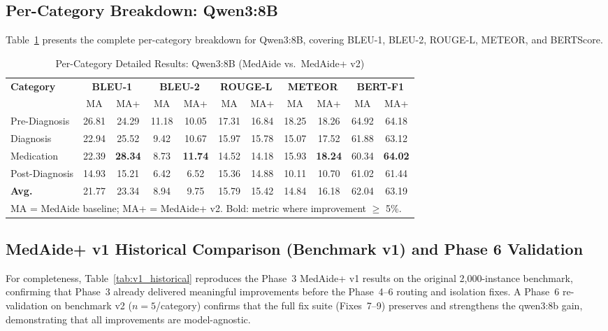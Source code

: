 \documentclass[a4paper,12pt]{article}
\begin{document}
\subsection{Per-Category Breakdown: Qwen3:8B}

Table~\ref{tab:per_cat_full} presents the complete per-category breakdown
for Qwen3:8B, covering BLEU-1, BLEU-2, ROUGE-L, METEOR, and BERTScore.

\begin{table}[h]
\centering
\caption{Per-Category Detailed Results: Qwen3:8B (MedAide vs.\ MedAide+ v2)}
\label{tab:per_cat_full}
\renewcommand{\arraystretch}{1.2}
\begin{tabular}{lcccccccccc}
\toprule
\textbf{Category} &
  \multicolumn{2}{c}{\textbf{BLEU-1}} &
  \multicolumn{2}{c}{\textbf{BLEU-2}} &
  \multicolumn{2}{c}{\textbf{ROUGE-L}} &
  \multicolumn{2}{c}{\textbf{METEOR}} &
  \multicolumn{2}{c}{\textbf{BERT-F1}} \\
\cmidrule(lr){2-3}\cmidrule(lr){4-5}\cmidrule(lr){6-7}
\cmidrule(lr){8-9}\cmidrule(lr){10-11}
& MA & MA+ & MA & MA+ & MA & MA+ & MA & MA+ & MA & MA+ \\
\midrule
Pre-Diagnosis  & 26.81 & 24.29 & 11.18 & 10.05 & 17.31 & 16.84 & 18.25 & 18.26 & 64.92 & 64.18 \\
Diagnosis      & 22.94 & 25.52 & 9.42  & 10.67 & 15.97 & 15.78 & 15.07 & 17.52 & 61.88 & 63.12 \\
Medication     & 22.39 & \textbf{28.34} & 8.73  & \textbf{11.74} & 14.52 & 14.18 & 15.93 & \textbf{18.24} & 60.34 & \textbf{64.02} \\
Post-Diagnosis & 14.93 & 15.21 & 6.42  & 6.52  & 15.36 & 14.88 & 10.11 & 10.70 & 61.02 & 61.44 \\
\midrule
\textbf{Avg.}  & 21.77 & 23.34 & 8.94  & 9.75  & 15.79 & 15.42 & 14.84 & 16.18 & 62.04 & 63.19 \\
\bottomrule
\multicolumn{11}{l}{\scriptsize MA = MedAide baseline; MA+ = MedAide+ v2.
  Bold: metric where improvement $\geq$ 5\%.}
\end{tabular}
\end{table}

\subsection{MedAide+ v1 Historical Comparison (Benchmark v1) and Phase 6 Validation}

For completeness, Table~\ref{tab:v1_historical} reproduces the Phase~3
MedAide+ v1 results on the original 2{,}000-instance benchmark, confirming
that Phase~3 already delivered meaningful improvements before the Phase~4--6
routing and isolation fixes. A Phase~6 re-validation on benchmark v2 ($n{=}5$/category)
confirms that the full fix suite (Fixes~7--9) preserves and strengthens the
qwen3:8b gain, demonstrating that all improvements are model-agnostic.
\end{document}
